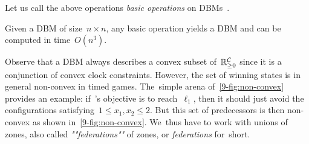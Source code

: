 Let us call the above operations \emph{basic operations} on DBMs~\cite{BY04}.
\begin{theorem}
\label{9-thm:complexity_basic_operations_DBMs}
  Given a DBM of size~$n\times n$, any basic operation yields a DBM
  and can be computed in time~$O(n^3)$.
\end{theorem}



Observe that a DBM always describes a convex subset
of~$\mathbb{R}_{\geq 0}^{\mathcal{C}}$ since it is a conjunction of convex clock
constraints. However, the set of winning states is in general
non-convex in timed games. The~simple arena
of~\cref{9-fig:non-convex} provides an example: if~\Eve's objective
is to reach~$\ell_1$, then it should just avoid the configurations
satisfying~$1\leq x_1,x_2\leq 2$. But this set of predecessors is then
non-convex as shown in~\cref{9-fig:non-convex}.
We~thus have to work with unions of zones, also called
\emph{""federations""} of zones, or \emph{federations} for~short.

